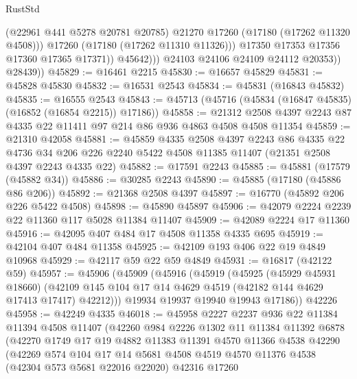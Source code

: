 \begin{lexlean}{RustStd}
\begin{coremodule}
                          (@22961 @441 @5278 @20781 @20785)
                          @21270
                          @17260
                          (@17180 (@17262 @11320 @4508)))
                        @17260
                        (@17180 (@17262 @11310 @11326)))
                      @17350
                      @17353
                      @17356
                      @17360
                      @17365
                      @17371))
                  @45642)))
            @24103
            @24106
            @24109
            @24112
            @20353))
        @28439))
@45829 := @16461 @2215
@45830 := @16657 @45829
@45831 := @45828 @45830
@45832 := @16531 @2543
@45834 := @45831 (@16843 @45832)
@45835 := @16555 @2543
@45843 := @45713 (@45716 (@45834 (@16847 @45835) (@16852 (@16854 @2215)) @17186))
@45858 := @21312 @2508 @4397 @2243 @87 @4335 @22 @11411 @97 @214 @86 @936 @4863 @4508 @4508 @11354
@45859 := @21310 @42058
@45881 := @45859
    @4335
    @2508
    @4397
    @2243
    @86
    @4335
    @22
    @4736
    @34
    @206
    @226
    @2240
    @5422
    @4508
    @11385
    @11407
    (@21351 @2508 @4397 @2243 @4335 @22)
@45882 := @17591 @2243
@45885 := @45881 (@17579 (@45882 @34))
@45886 := @30285 @2243
@45890 := @45885 (@17180 (@45886 @86 @206))
@45892 := @21368 @2508 @4397
@45897 := @16770 (@45892 @206 @226 @5422 @4508)
@45898 := @45890 @45897
@45906 := @42079 @2224 @2239 @22 @11360 @117 @5028 @11384 @11407
@45909 := @42089 @2224 @17 @11360
@45916 := @42095 @407 @484 @17 @4508 @11358 @4335 @695
@45919 := @42104 @407 @484 @11358
@45925 := @42109 @193 @406 @22 @19 @4849 @10968
@45929 := @42117 @59 @22 @59 @4849
@45931 := @16817 (@42122 @59)
@45957 := @45906
    (@45909
      (@45916
        (@45919
          (@45925
            (@45929 @45931 @18660)
            (@42109 @145 @104 @17 @14 @4629 @4519 (@42182 @144 @4629 @17413 @17417) @42212)))
        @19934
        @19937
        @19940
        @19943
        @17186))
    @42226
@45958 := @42249 @4335
@46018 := @45958
    @2227
    @2237
    @936
    @22
    @11384
    @11394
    @4508
    @11407
    (@42260
      @984
      @2226
      @1302
      @11
      @11384
      @11392
      @6878
      (@42270
        @1749
        @17
        @19
        @4882
        @11383
        @11391
        @4570
        @11366
        @4538
        @42290
        (@42269
          @574
          @104
          @17
          @14
          @5681
          @4508
          @4519
          @4570
          @11376
          @4538
          (@42304 @573 @5681 @22016 @22020)
          @42316
          @17260

\end{coremodule}
\end{lexlean}
